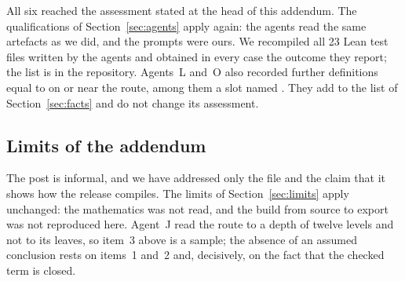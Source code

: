 All six reached the assessment stated at the head of this addendum. The qualifications of Section~\ref{sec:agents} apply again: the agents read the same artefacts as we did, and the prompts were ours.
We recompiled all 23 Lean test files written by the agents and obtained in every case the outcome they report; the list is in the repository.
Agents~L and~O also recorded further definitions equal to  on or near the route, among them a slot named . They add to the list of Section~\ref{sec:facts} and do not change its assessment.

\subsection{Limits of the addendum}

The post is informal, and we have addressed only the file and the claim that it shows how the release compiles.
The limits of Section~\ref{sec:limits} apply unchanged: the mathematics was not read, and the build from source to export was not reproduced here.
Agent~J read the route to a depth of twelve levels and not to its leaves, so item~3 above is a sample; the absence of an assumed conclusion rests on items~1 and~2 and, decisively, on the fact that the checked term is closed.
